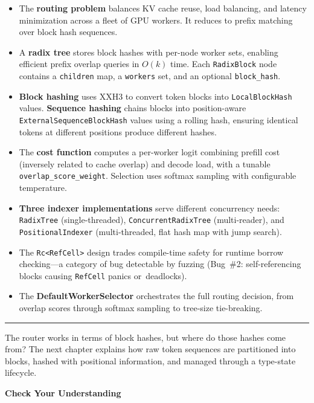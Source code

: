 \begin{itemize}
  \item The \textbf{routing problem} balances KV cache reuse, load balancing, and latency minimization across a fleet of GPU workers. It reduces to prefix matching over block hash sequences.
  \item A \textbf{radix tree} stores block hashes with per-node worker sets, enabling efficient prefix overlap queries in $O(k)$ time. Each \texttt{RadixBlock} node contains a \texttt{children} map, a \texttt{workers} set, and an optional \texttt{block\_hash}.
  \item \textbf{Block hashing} uses XXH3 to convert token blocks into \texttt{LocalBlockHash} values. \textbf{Sequence hashing} chains blocks into position-aware \texttt{ExternalSequenceBlockHash} values using a rolling hash, ensuring identical tokens at different positions produce different hashes.
  \item The \textbf{cost function} computes a per-worker logit combining prefill cost (inversely related to cache overlap) and decode load, with a tunable \texttt{overlap\_score\_weight}. Selection uses softmax sampling with configurable temperature.
  \item \textbf{Three indexer implementations} serve different concurrency needs: \texttt{Radix\-Tree} (single-threaded), \texttt{Concurrent\-Radix\-Tree} (multi-reader), and \texttt{Positional\-Indexer} (multi-threaded, flat hash map with jump search).
  \item The \texttt{Rc<RefCell>} design trades compile-time safety for runtime borrow checking---a category of bug detectable by fuzzing (Bug~\#2: self-referencing blocks causing \texttt{RefCell} panics or~deadlocks).
  \item The \textbf{DefaultWorkerSelector} orchestrates the full routing decision, from overlap scores through softmax sampling to tree-size tie-breaking.
\end{itemize}

\medskip
\begin{center}\rule{0.5\linewidth}{0.4pt}\end{center}
\medskip

The router works in terms of block hashes, but where do those hashes come from? The next chapter explains how raw token sequences are partitioned into blocks, hashed with positional information, and managed through a type-state lifecycle.

\medskip
\noindent\textbf{Check Your Understanding}

